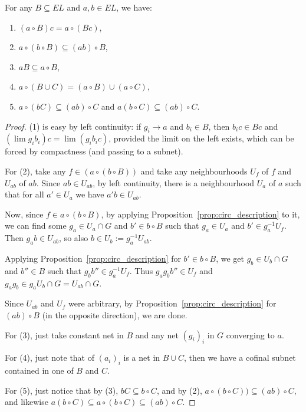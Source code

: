 	\begin{fct}
		\label{fct:circ_calculations}
		For any $B\subseteq EL$ and $a,b\in EL$, we have:
		\begin{enumerate}
			\item
			$(a\circ B)c=a\circ (Bc)$,
			\item
			$a\circ(b\circ B)\subseteq (ab)\circ B$,
			\item
			$aB\subseteq a\circ B$,
			\item
			$a\circ(B\cup C)=(a\circ B)\cup (a\circ C)$,
			\item
			$a\circ(bC)\subseteq (ab)\circ C$ and $a(b\circ C)\subseteq (ab)\circ C$.
		\end{enumerate}
	\end{fct}
	\begin{proof}
		(1) is easy by left continuity: if $g_i\to a$ and $b_i\in B$, then $b_ic\in Bc$ and $(\lim g_ib_i)c=\lim(g_ib_ic)$, provided the limit on the left exists, which can be forced by compactness (and passing to a subnet).
		
		For (2), take any $f\in (a\circ (b\circ B))$ and take any neighbourhoods $U_f$ of $f$ and $U_{ab}$ of $ab$. Since $ab\in U_{ab}$, by left continuity, there is a neighbourhood $U_a$ of $a$ such that for all $a'\in U_a$ we have $a'b\in U_{ab}$.
		
		Now, since $f\in a\circ (b\circ B)$, by applying Proposition~\ref{prop:circ_description} to it, we can find some $g_a\in U_a\cap G$ and $b'\in b\circ B$ such that $g_a\in U_{a}$ and $b'\in g_{a}^{-1}U_f$. Then $g_ab\in U_{ab}$, so also $b\in U_b:=g_a^{-1}U_{ab}$.
		
		Applying Proposition~\ref{prop:circ_description} for $b'\in b\circ B$, we get $g_b\in U_b\cap G$ and $b''\in B$ such that $g_bb''\in g_a^{-1}U_f$. Thus $g_ag_bb''\in U_f$ and $g_ag_b\in g_aU_b\cap G=U_{ab}\cap G$.
		
		Since $U_{ab}$ and $U_f$ were arbitrary, by Proposition~\ref{prop:circ_description} for $(ab)\circ B$ (in the opposite direction), we are done.
		
		For (3), just take constant net in $B$ and any net $(g_i)_i$ in $G$ converging to $a$.
		
		For (4), just note that of $(a_i)_i$ is a net in $B\cup C$, then we have a cofinal subnet contained in one of $B$ and $C$.
		
		For (5), just notice that by (3), $bC\subseteq b\circ C$, and by (2), $a\circ(b\circ C))\subseteq (ab)\circ C$, and likewise $a(b\circ C)\subseteq a\circ (b\circ C)\subseteq (ab)\circ C$.
	\end{proof}
	
